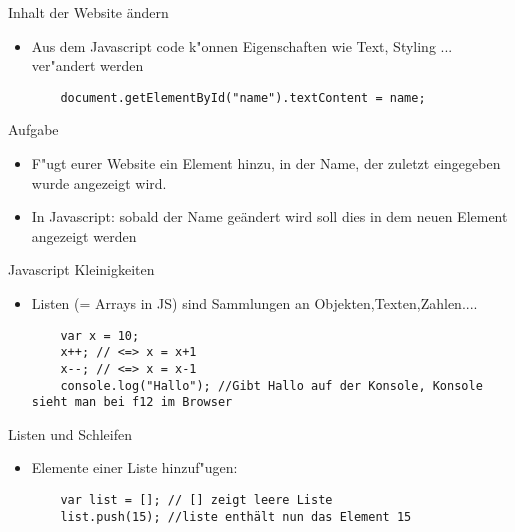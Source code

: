 \documentclass[18pt]{beamer}
\begin{document}
\begin{frame}[fragile]{Inhalt der Website ändern}
\begin{itemize}
	\item Aus dem Javascript code k"onnen Eigenschaften wie Text, Styling ... ver"andert werden
	\begin{lstlisting}
	document.getElementById("name").textContent = name;
	\end{lstlisting}
\end{itemize}
\end{frame}

\begin{frame}[fragile]{Aufgabe}
\begin{itemize}
	\item F"ugt eurer Website ein Element hinzu, in der Name, der zuletzt eingegeben wurde angezeigt wird. 
	\item In Javascript: sobald der Name geändert wird soll dies in dem neuen Element angezeigt werden
\end{itemize}
\end{frame}

\begin{frame}[fragile]{Javascript Kleinigkeiten}
\begin{itemize}
	\item Listen (= Arrays in JS) sind Sammlungen an Objekten,Texten,Zahlen....
	\begin{lstlisting}
	var x = 10;
	x++; // <=> x = x+1 
	x--; // <=> x = x-1
	console.log("Hallo"); //Gibt Hallo auf der Konsole, Konsole sieht man bei f12 im Browser
	\end{lstlisting}
\end{itemize}
\end{frame}

\begin{frame}[fragile]{Listen und Schleifen}
\begin{itemize}
		\begin{lstlisting}
	var list = []; // []  leere Liste
	var list2 = [1,5,10]; // Liste aus 1,5,10
	\end{lstlisting}
	\item Elemente einer Liste hinzuf"ugen: 
		\begin{lstlisting}
	var list = []; // [] zeigt leere Liste
	list.push(15); //liste enthält nun das Element 15
	\end{lstlisting}	
\end{itemize}
\end{frame}
\end{document}
